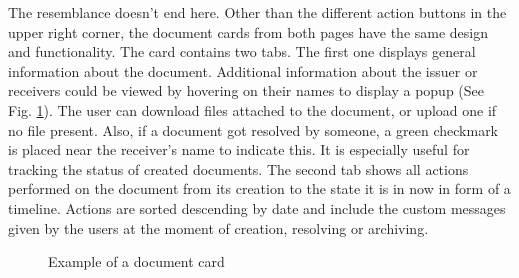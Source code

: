 The resemblance doesn't end here. Other than the different action buttons in the upper right corner, the document cards from both pages have the same design and functionality. The card contains two tabs. The first one displays general information about the document. Additional information about the issuer or receivers could be viewed by hovering on their names to display a popup (See Fig. \ref{documentCard}).  The user can download files attached to the document, or upload one if no file present. Also, if a document got resolved by someone, a green checkmark is placed near the receiver's name to indicate this. It is especially useful for tracking the status of created documents. The second tab shows all actions performed on the document from its creation to the state it is in now in form of a timeline. Actions are sorted descending by date and include the custom messages given by the users at the moment of creation, resolving or archiving.

\begin{figure}[H]
    \centering
    \qquad
    \caption{Example of a document card}
    \label{documentCard}
\end{figure}


